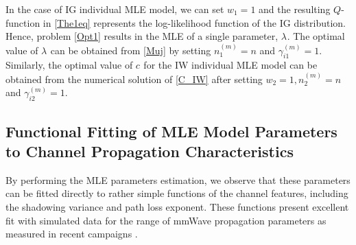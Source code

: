 \documentclass[12pt, draftclsnofoot, onecolumn]{IEEEtran}
\theoremstyle{plain}
\begin{document}
In the case of IG individual MLE model, we can set $w_1=1$ and the resulting $Q$-function in \eqref{The1eq} represents the log-likelihood function of the IG distribution. Hence, %
problem \eqref{Opt1} results in the MLE of a single parameter, ${{\lambda_{}}}$. The optimal value of ${{\lambda_{}}}$ can be obtained from \eqref{Muj} by setting $n_1^{(m)}=n$ and $\gamma_{i1}^{(m)}=1$. Similarly, the optimal value of ${{c_{}}}$ for the IW individual MLE model can be obtained from the numerical solution of \eqref{C_IW} after setting $w_2 = 1, n_2^{(m)}=n$ and $\gamma_{i2}^{(m)}=1$.
\vspace{-.15in}
\subsection{Functional Fitting of MLE Model Parameters to {\color{black}Channel} Propagation Characteristics} %
%
By performing the MLE parameters estimation, we observe that these parameters can be fitted directly to rather simple functions of the {\color{black}channel} features, including the shadowing variance and path loss exponent. These functions present excellent fit with simulated data for the range of mmWave propagation parameters as measured in recent campaigns \cite{mmWave2,mmWave4,mmWave6515173,mmWave6387266}.
\end{document}
